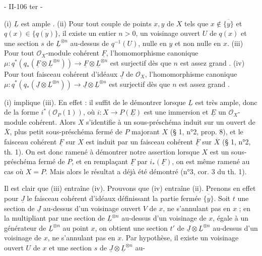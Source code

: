 
- II-106 ter -

(i) $\underline{L}$ est ample .
(ii) Pour tout couple de points $x, y$ de $X$ tels que $x \notin \overline{\{y\}}$ et $q(x) \in \overline{\{q(y)\}}$, il existe un entier $n > 0$, un voisinage ouvert $U$ de $q(x)$ et une section $s$ de $\underline{L}^{\otimes n}$ au-dessus de $q^{-1}(U)$, nulle en $y$ et non nulle en $x$.
(iii) Pour tout $\mathcal{O}_X$-module cohérent $\underline{F}$, l'homomorphisme canonique $\mu : q^*(q_*(\underline{F} \otimes \underline{L}^{\otimes n})) \to \underline{F} \otimes \underline{L}^{\otimes n}$ est surjectif dès que $n$ est assez grand .
(iv) Pour tout faisceau cohérent d'idéaux $\underline{J}$ de $\mathcal{O}_X$, l'homomorphisme canonique $\mu : q^*(q_*(\underline{J} \otimes \underline{L}^{\otimes n})) \to \underline{J} \otimes \underline{L}^{\otimes n}$ est surjectif dès que $n$ est assez grand .

(i) implique (iii). En effet : il suffit de le démontrer lorsque $\underline{L}$ est très ample, donc de la forme $i^*(\mathcal{O}_P(1))$, où $i : X \to P(\underline{E})$ est une immersion et $\underline{E}$ un $\mathcal{O}_X$-module cohérent. Alors $X$ s'identifie à un sous-préschéma induit sur un ouvert de $\overline{X}$, plus petit sous-préschéma fermé de $P$ majorant $X$ (§ 1, n°2, prop. 8), et le faisceau cohérent $\underline{F}$ sur $X$ est induit par un faisceau cohérent $\underline{\overline{F}}$ sur $\overline{X}$ (§ 1, n°2, th. 1). On est donc ramené à démontrer notre assertion lorsque $X$ est un sous-préschéma fermé de $P$, et en remplaçant $\underline{F}$ par $i_*(\underline{F})$, on est même ramené au cas où $X=P$. Mais alors le résultat a déjà été démontré (n°3, cor. 3 du th. 1).

Il est clair que (iii) entraîne (iv). Prouvons que (iv) entraîne (ii). Prenons en effet pour $\underline{J}$ le faisceau cohérent d'idéaux définissant la partie fermée $\overline{\{y\}}$. Soit $t$ une section de $\underline{J}$ au-dessus d'un voisinage ouvert $V$ de $x$, ne s'annulant pas en $x$ ; en la multipliant par une section de $\underline{L}^{\otimes n}$ au-dessus d'un voisinage de $x$, égale à un générateur de $\underline{L}^{\otimes n}$ au point $x$, on obtient une section $t'$ de $\underline{J} \otimes \underline{L}^{\otimes n}$ au-dessus d'un voisinage de $x$, ne s'annulant pas en $x$. Par hypothèse, il existe un voisinage ouvert $U$ de $x$ et une section $s$ de $\underline{J} \otimes \underline{L}^{\otimes n}$ au-

